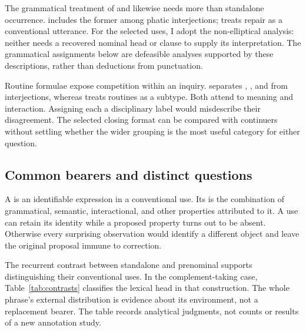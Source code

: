 \documentclass[12pt]{article}
\begin{document}
The grammatical treatment of  and  likewise
needs more than standalone occurrence. \textcite[114]{ameka1992} includes the former among
phatic interjections; \textcite[152]{wilkins1992} treats repair 
as a conventional utterance.
For the selected uses, I adopt the non-elliptical analysis: neither needs
a recovered nominal head or clause to supply its interpretation.
The grammatical assignments below are defeasible analyses supported by
these descriptions, rather than deductions from punctuation.

Routine formulae expose competition within an inquiry.
\textcite[108--110]{ameka1992} separates , ,
and  from interjections, whereas
\textcite[142]{wilkins1992} treats routines as a subtype. Both attend
to meaning and interaction. Assigning each a disciplinary label would
misdescribe their disagreement. The selected closing format can be
compared with continuers without settling whether the wider grouping
is the most useful category for either question.

\subsection{Common bearers and distinct questions}

A  is an identifiable expression in a conventional use.
Its  is the combination of grammatical, semantic, interactional,
and other properties attributed to it. A use can retain its identity
while a proposed property turns out to be absent. Otherwise every
surprising observation would identify a different object and leave the
original proposal immune to correction.

The recurrent contrast between standalone and prenominal 
supports distinguishing their conventional uses. In the complement-taking
case, Table~\ref{tab:contrasts} classifies the lexical head 
in that construction. The whole phrase's external distribution is evidence
about its environment, not a replacement bearer. The table records
analytical judgments, not counts or results of a new annotation study.
\end{document}
